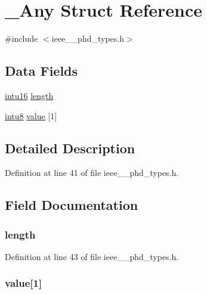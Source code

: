 \hypertarget{struct___any}{}\section{\+\_\+\+Any Struct Reference}
\label{struct___any}


{\ttfamily \#include $<$ieee\+\_\+\_\+phd\+\_\+types.\+h$>$}

\subsection*{Data Fields}
\begin{DoxyCompactItemize}
\item 
\hyperlink{ieee__11073__phd__types_8h_a3561595d2aa7416532e1c9910abd076d}{intu16} \hyperlink{struct___any_a3743679e4ff85e3e1b3fc2e59973fbb3}{length}
\item 
\hyperlink{ieee__11073__phd__types_8h_ae21d5428a584a153613cbe335630d3f4}{intu8} \hyperlink{struct___any_a60ac419fb75046efa2e20ee72ec2ea45}{value} \mbox{[}1\mbox{]}
\end{DoxyCompactItemize}


\subsection{Detailed Description}


Definition at line 41 of file ieee\+\_\+\_\+phd\+\_\+types.\+h.



\subsection{Field Documentation}
\hypertarget{struct___any_a3743679e4ff85e3e1b3fc2e59973fbb3}{}
\subsubsection[{length}]{ length}\label{struct___any_a3743679e4ff85e3e1b3fc2e59973fbb3}


Definition at line 43 of file ieee\+\_\+\_\+phd\+\_\+types.\+h.

\hypertarget{struct___any_a60ac419fb75046efa2e20ee72ec2ea45}{}
\subsubsection[{value}]{ value\mbox{[}1\mbox{]}}\label{struct___any_a60ac419fb75046efa2e20ee72ec2ea45}


